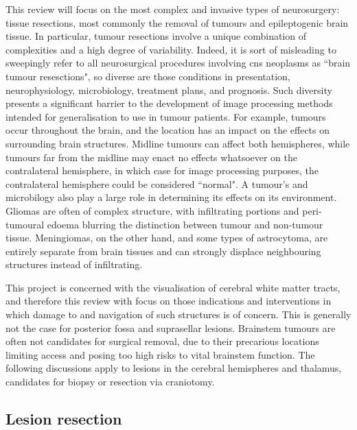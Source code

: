 This review will focus on the most complex and invasive types of neurosurgery: tissue resections, most commonly the removal of tumours and epileptogenic brain tissue. 
In particular, tumour resections involve a unique combination of complexities and a high degree of variability.
Indeed, it is sort of misleading to sweepingly refer to all neurosurgical procedures involving  \gls{cns} neoplasms as ``brain tumour resesctions", so diverse are those conditions in presentation, neurophysiology, microbiology, treatment plans, and prognosis.
Such diversity presents a significant barrier to the development of image processing methods intended for generalisation to use in tumour patients.
For example, tumours occur throughout the brain, and the location has an impact on the effects on surrounding brain structures.
Midline tumours can affect both hemispheres, while tumours far from the midline may enact no effects whatsoever on the contralateral hemisphere, in which case for image processing purposes, the contralateral hemisphere could be considered ``normal".
A tumour's  and microbilogy also play a large role in determining its effects on its environment.
Gliomas are often of complex structure, with infiltrating portions and peri-tumoural edoema blurring the distinction between tumour and non-tumour tissue.
Meningiomas, on the other hand, and some types of astrocytoma, are entirely  separate from brain tissues and can strongly displace neighbouring structures instead of infiltrating.

This project is concerned with the visualisation of cerebral white matter tracts, and therefore this review with focus on those indications and interventions in which damage to and navigation of such structures is of concern.
This is generally not the case for posterior fossa and suprasellar lesions.
Brainstem tumours are often not candidates for surgical removal, due to their precarious locations limiting access and posing too high risks to vital brainstem function.
The following discussions apply to lesions in the cerebral hemispheres and thalamus, candidates for biopsy or resection via craniotomy.

\subsection{Lesion resection}


